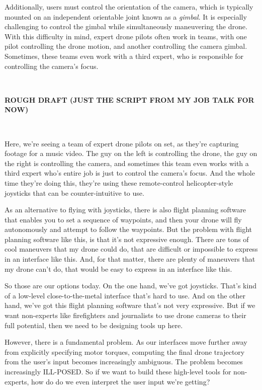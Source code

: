 Additionally, users must control the orientation of the camera, which is typically mounted on an independent orientable joint known as a \emph{gimbal}.
It is especially challenging to control the gimbal while simultaneously maneuvering the drone.
With this difficulty in mind, expert drone pilots often work in teams, with one pilot controlling the drone motion, and another controlling the camera gimbal.
Sometimes, these teams even work with a third expert, who is responsible for controlling the camera's focus.

~

\hspace{-15pt}\textbf{ROUGH DRAFT (JUST THE SCRIPT FROM MY JOB TALK FOR NOW)}

~

\hspace{-15pt}Here, we’re seeing a team of expert drone pilots on set, as they’re capturing footage for a music video.
The guy on the left is controlling the drone, the guy on the right is controlling the camera, and sometimes this team even works with a third expert who’s entire job is just to control the camera’s focus.
And the whole time they’re doing this, they’re using these remote-control helicopter-style joysticks that can be counter-intuitive to use.

As an alternative to flying with joysticks, there is also flight planning software that enables you to set a sequence of waypoints, and then your drone will fly autonomously and attempt to follow the waypoints.
But the problem with flight planning software like this, is that it’s not expressive enough.
There are tons of cool maneuvers that my drone could do, that are difficult or impossible to express in an interface like this.
And, for that matter, there are plenty of maneuvers that my drone can’t do, that would be easy to express in an interface like this.

So those are our options today.
On the one hand, we’ve got joysticks.
That’s kind of a low-level close-to-the-metal interface that’s hard to use.
And on the other hand, we’ve got this flight planning software that’s not very expressive.
But if we want non-experts like firefighters and journalists to use drone cameras to their full potential, then we need to be designing tools up here.

However, there is a fundamental problem.
As our interfaces move further away from explicitly specifying motor torques, computing the final drone trajectory from the user’s input becomes increasingly ambiguous.
The problem becomes increasingly ILL-POSED.
So if we want to build these high-level tools for non-experts, how do do we even interpret the user input we’re getting?

